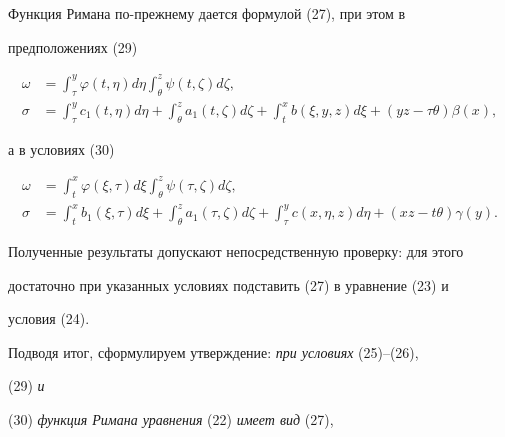 Функция Римана по-прежнему дается формулой (27), при этом в


предположениях (29)


\begin{equation}


\begin{split}


\omega&=\int^y_\tau \varphi(t,\eta)d\eta\int^z_\theta


\psi(t,\zeta)d\zeta,\\


\sigma&=\int^y_\tau c_1(t,\eta)d\eta+


\int^z_\theta a_1(t,\zeta)d\zeta+\int^x_t b(\xi,y,z)d\xi+


(yz-\tau\theta)\beta(x),


\end{split}


\end{equation}


а в условиях (30)


\begin{equation}


\begin{split}


\omega&=\int^x_t\varphi(\xi,\tau)d\xi\int^z_\theta\psi(\tau,\zeta)


d\zeta,\\


\sigma&=\int^x_t b_1(\xi,\tau)d\xi+


\int^z_\theta a_1(\tau,\zeta)d\zeta+\int^y_\tau


c(x,\eta,z)d\eta+(xz-t\theta)\gamma(y).


\end{split}


\end{equation}





Полученные результаты допускают непосредственную проверку: для этого


достаточно при указанных условиях подставить (27) в уравнение (23) и


условия (24).





Подводя итог, сформулируем утверждение: {\it при условиях} (25)--(26),


(29) {\it и}


(30) {\it функция Римана уравнения} (22) {\it имеет вид} (27),


